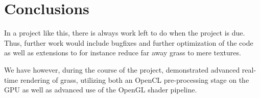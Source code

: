 \section{Conclusions}
\label{cha:conclusions}
In a project like this, there is always work left to do when the project is due.
Thus, further work would include bugfixes and further optimization of the code as well as
extensions to for instance reduce far away grass to mere textures.

We have however, during the course of the project, demonstrated advanced
real-time rendering of grass, utilizing both an OpenCL pre-processing stage
on the GPU as well as advanced use of the OpenGL shader pipeline.
